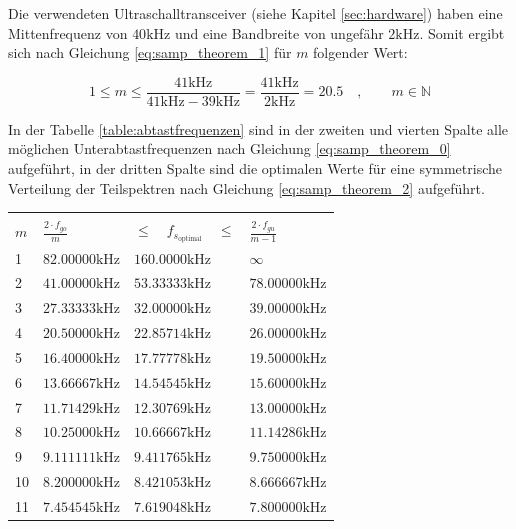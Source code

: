 Die verwendeten Ultraschalltransceiver (siehe Kapitel \ref{sec:hardware}) haben eine Mittenfrequenz von $40 \mathrm{kHz}$ und eine Bandbreite von ungefähr $2 \mathrm{kHz}$. Somit ergibt sich nach Gleichung \ref{eq:samp_theorem_1} für $m$ folgender Wert:

$$1 \leq m \leq \frac{41 \mathrm{kHz}}{41 \mathrm{kHz} - 39 \mathrm{kHz}} = \frac{41 \mathrm{kHz}}{2 \mathrm{kHz}} = 20.5 \quad , \qquad m \in \mathbb{N}$$

In der Tabelle \ref{table:abtastfrequenzen} sind in der zweiten und vierten Spalte alle möglichen Unterabtastfrequenzen nach Gleichung \ref{eq:samp_theorem_0} aufgeführt, in der dritten Spalte sind die optimalen Werte für eine symmetrische Verteilung der Teilspektren nach Gleichung \ref{eq:samp_theorem_2} aufgeführt.

\begin{table}
\begin{center}
\begin{tabular}{|p{}|p{}|p{}|p{}|}
\hline
	&				&				&			 \\[-3mm]
$m$	& $\frac{2 \cdot f_{go}}{m}$	& $\leq \quad f_{s_{\mathrm{optimal}}} \quad \leq$	& $\frac{2 \cdot f_{gu}}{m-1}$ \\[1mm]
\hline
1	& $82.00000 \mathrm{kHz}$	& $160.0000 \mathrm{kHz}$	& $\infty$	 \\
2	& $41.00000 \mathrm{kHz}$	& $53.33333 \mathrm{kHz}$	& $78.00000 \mathrm{kHz}$ \\
3	& $27.33333 \mathrm{kHz}$	& $32.00000 \mathrm{kHz}$	& $39.00000 \mathrm{kHz}$ \\
4	& $20.50000 \mathrm{kHz}$	& $22.85714 \mathrm{kHz}$	& $26.00000 \mathrm{kHz}$ \\
5	& $16.40000 \mathrm{kHz}$	& $17.77778 \mathrm{kHz}$ 	& $19.50000 \mathrm{kHz}$\\
6	& $13.66667 \mathrm{kHz}$	& $14.54545 \mathrm{kHz}$ 	& $15.60000 \mathrm{kHz}$\\
7	& $11.71429 \mathrm{kHz}$	& $12.30769 \mathrm{kHz}$ 	& $13.00000 \mathrm{kHz}$\\
8	& $10.25000 \mathrm{kHz}$	& $10.66667 \mathrm{kHz}$ 	& $11.14286 \mathrm{kHz}$\\
9	& $9.111111 \mathrm{kHz}$	& $9.411765 \mathrm{kHz}$ 	& $9.750000 \mathrm{kHz}$\\
10	& $8.200000 \mathrm{kHz}$	& $8.421053 \mathrm{kHz}$ 	& $8.666667 \mathrm{kHz}$\\
11	& $7.454545 \mathrm{kHz}$	& $7.619048 \mathrm{kHz}$ 	& $7.800000 \mathrm{kHz}$\\

\end{tabular}
\end{center}
\end{table}
